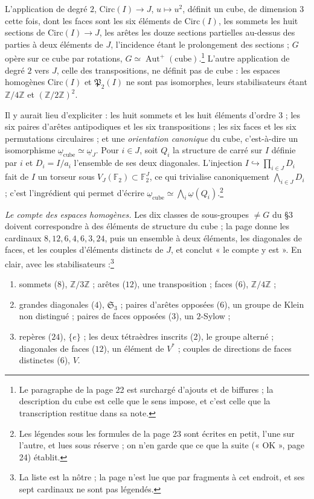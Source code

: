 \documentclass[11pt,a4paper]{article}
\begin{document}
L'application de degré $2$, $\mathrm{Circ}(I) \to J$, $u \mapsto u^2$, définit
un cube, de dimension $3$ cette fois, dont les faces sont les six
éléments de $\mathrm{Circ}(I)$, les sommets les huit sections de
$\mathrm{Circ}(I) \to J$, les arêtes les douze sections partielles au-dessus
des parties à deux éléments de $J$, l'incidence étant le prolongement des
sections ; $G$ opère sur ce cube par rotations, $G \simeq
\operatorname{Aut}^{+}(\text{cube})$.\footnote{Le paragraphe de la page 22 est
surchargé d'ajouts et de biffures ; la description du cube est celle que le sens
impose, et c'est celle que la transcription restitue dans sa note.} L'autre
application de degré $2$ vers $J$, celle des transpositions, ne définit pas de
cube : les espaces homogènes $\mathrm{Circ}(I)$ et $\mathfrak{P}_2(I)$ ne sont
pas isomorphes, leurs stabilisateurs étant $\mathbb{Z}/4\mathbb{Z}$ et
$(\mathbb{Z}/2\mathbb{Z})^2$.

Il y aurait lieu d'expliciter : les huit sommets et les huit éléments d'ordre
$3$ ; les six paires d'arêtes antipodiques et les six transpositions ; les six
faces et les six permutations circulaires ; et une \emph{orientation canonique}
du cube, c'est-à-dire un isomorphisme
$\underline{\omega}_{\text{cube}} \simeq \underline{\omega}_J$. Pour $i \in J$,
soit $Q_i$ la structure de carré sur $I$ définie par $i$ et $D_i = I/a_i$
l'ensemble de ses deux diagonales. L'injection $I \hookrightarrow \prod_{i \in J}
D_i$ fait de $I$ un torseur sous $V_J(\mathbb{F}_2) \subset \mathbb{F}_2^{J}$,
ce qui trivialise canoniquement $\bigwedge_{i \in J} D_i$ ; c'est l'ingrédient
qui permet d'écrire $\underline{\omega}_{\text{cube}} \simeq \bigwedge_{i}
\underline{\omega}(Q_i)$.\footnote{Les légendes sous les formules de la page 23
sont écrites en petit, l'une sur l'autre, et lues sous réserve ; on n'en garde
que ce que la suite (« OK », page 24) établit.}

\emph{Le compte des espaces homogènes.} Les dix classes de sous-groupes
$\neq G$ du §3 doivent correspondre à des éléments de structure du cube ; la
page donne les cardinaux $8, 12, 6, 4, 6, 3, 24$, puis un ensemble à deux
éléments, les diagonales de faces, et les couples d'éléments distincts de $J$,
et conclut « le compte y est ». En clair, avec les
stabilisateurs :\footnote{La liste est la nôtre ; la page n'est lue que par
fragments à cet endroit, et ses sept cardinaux ne sont pas légendés.}
\begin{enumerate}
\item[--] sommets ($8$), $\mathbb{Z}/3\mathbb{Z}$ ; arêtes ($12$), une
transposition ; faces ($6$), $\mathbb{Z}/4\mathbb{Z}$ ;
\item[--] grandes diagonales ($4$), $\mathfrak{S}_3$ ; paires d'arêtes opposées
($6$), un groupe de Klein non distingué ; paires de faces opposées ($3$), un
$2$-Sylow ;
\item[--] repères ($24$), $\{e\}$ ; les deux tétraèdres inscrits ($2$), le
groupe alterné ; diagonales de faces ($12$), un élément de $V^{*}$ ; couples de
directions de faces distinctes ($6$), $V$.
\end{enumerate}
\end{document}

